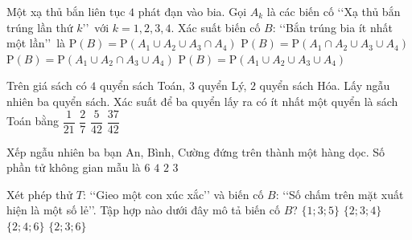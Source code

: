 \begin{ex}%
	Một xạ thủ bắn liên tục $4$ phát đạn vào bia. Gọi $A_k$ là các biến cố \lq\lq  Xạ thủ bắn trúng lần thứ $k$\rq\rq \, với $k=1,2,3,4$. Xác suất biến cố $B$: \lq\lq  Bắn trúng bia ít nhất một lần\rq\rq \, là
	\choice
	{$\mathrm{P}(B)=\mathrm{P}(A_1 \cup A_2 \cup A_3 \cap A_4)$}
	{$\mathrm{P}(B)=\mathrm{P}(A_1 \cap A_2 \cup A_3 \cup A_4)$}
	{$\mathrm{P}(B)=\mathrm{P}(A_1 \cup A_2 \cap A_3 \cup A_4)$}
	{\True $\mathrm{P}(B)=\mathrm{P}(A_1 \cup A_2 \cup A_3 \cup A_4)$}
\end{ex}
\begin{ex}%
	Trên giá sách có $4$ quyển sách Toán, $3$ quyển Lý, $2$ quyển sách Hóa. Lấy ngẫu nhiên ba quyển sách. Xác suất để ba quyển lấy ra có ít nhất một quyển là sách Toán bằng
	\choice
	{$\dfrac{1}{21}$} 
	{$\dfrac{2}{7}$}
	{$\dfrac{5}{42}$}
	{\True $\dfrac{37}{42}$}
\end{ex}
\begin{ex}%
	Xếp ngẫu nhiên ba bạn An, Bình, Cường đứng trên thành một hàng dọc. Số phần tử không gian mẫu là
	\choice
	{\True $6$}
	{$4$}
	{$2$}
	{$3$}	
\end{ex}
\begin{ex}%
	Xét phép thử $T$: \lq\lq  Gieo một con xúc xắc\rq\rq\;  và biến cố $B$: \lq\lq  Số chấm trên mặt xuất hiện là một số lẻ\rq\rq. Tập hợp nào dưới đây mô tả biến cố $B$?
	\choice
	{\True $\{1;3;5\}$}
	{$\{2;3;4\}$}
	{$\{2;4;6\}$}
	{$\{2;3;6\}$}	
\end{ex}
